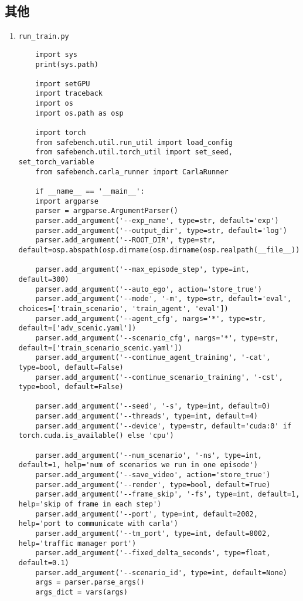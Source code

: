 \subsection*{其他}
\begin{enumerate}
\item \texttt{run\_train.py}
\begin{verbatim}
	import sys
	print(sys.path)
	
	import setGPU
	import traceback
	import os
	import os.path as osp
	
	import torch 
	from safebench.util.run_util import load_config
	from safebench.util.torch_util import set_seed, set_torch_variable
	from safebench.carla_runner import CarlaRunner
	
	if __name__ == '__main__':
	import argparse
	parser = argparse.ArgumentParser()
	parser.add_argument('--exp_name', type=str, default='exp')
	parser.add_argument('--output_dir', type=str, default='log')
	parser.add_argument('--ROOT_DIR', type=str, default=osp.abspath(osp.dirname(osp.dirname(osp.realpath(__file__)))))
	
	parser.add_argument('--max_episode_step', type=int, default=300)
	parser.add_argument('--auto_ego', action='store_true')
	parser.add_argument('--mode', '-m', type=str, default='eval', choices=['train_scenario', 'train_agent', 'eval'])
	parser.add_argument('--agent_cfg', nargs='*', type=str, default=['adv_scenic.yaml'])
	parser.add_argument('--scenario_cfg', nargs='*', type=str, default=['train_scenario_scenic.yaml'])
	parser.add_argument('--continue_agent_training', '-cat', type=bool, default=False)
	parser.add_argument('--continue_scenario_training', '-cst', type=bool, default=False)
	
	parser.add_argument('--seed', '-s', type=int, default=0)
	parser.add_argument('--threads', type=int, default=4)
	parser.add_argument('--device', type=str, default='cuda:0' if torch.cuda.is_available() else 'cpu')   
	
	parser.add_argument('--num_scenario', '-ns', type=int, default=1, help='num of scenarios we run in one episode')
	parser.add_argument('--save_video', action='store_true')
	parser.add_argument('--render', type=bool, default=True)
	parser.add_argument('--frame_skip', '-fs', type=int, default=1, help='skip of frame in each step')
	parser.add_argument('--port', type=int, default=2002, help='port to communicate with carla')
	parser.add_argument('--tm_port', type=int, default=8002, help='traffic manager port')
	parser.add_argument('--fixed_delta_seconds', type=float, default=0.1)
	parser.add_argument('--scenario_id', type=int, default=None)
	args = parser.parse_args()
	args_dict = vars(args)
	

\end{verbatim}
\end{enumerate}
